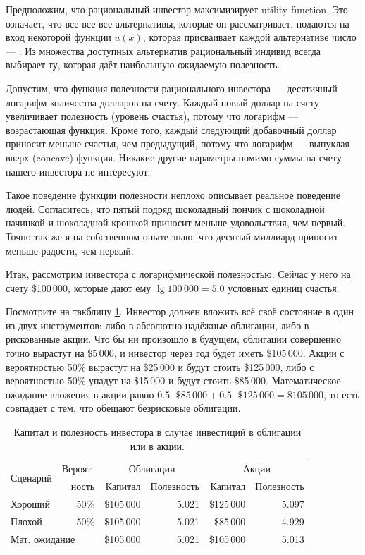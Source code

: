 Предположим, что рациональный инвестор максимизирует 
{utility function}. Это означает, что все-все-все альтернативы, которые он рассматривает, подаются на вход некоторой функции $u(x)$, которая присваивает
каждой альтернативе число --- . Из множества доступных 
альтернатив рациональный индивид всегда выбирает ту, которая даёт наибольшую
ожидаемую полезность.
 
Допустим, что функция полезности рационального инвестора --- десятичный логарифм
количества долларов на счету. Каждый новый доллар на счету увеличивает
полезность (уровень счастья), потому что логарифм --- возрастающая функция.
Кроме того, каждый следующий добавочный доллар приносит меньше счастья, чем
предыдущий, потому что логарифм --- выпуклая вверх (concave) функция. Никакие
другие параметры помимо суммы на счету нашего инвестора не интересуют.
 
Такое поведение функции полезности неплохо описывает реальное поведение людей. Согласитесь, что пятый подряд шоколадный пончик с шоколадной начинкой и шоколадной крошкой приносит меньше удовольствия, чем первый. Точно так же я на собственном опыте знаю, что десятый миллиард приносит меньше радости, чем первый.
 
Итак, рассмотрим инвестора с логарифмической полезностью. Сейчас у него на счету \$100\,000, которые дают ему $\lg 100\,000 = 5.0$ условных единиц счастья.
 
Посмотрите на такблицу \ref{logarithmic_utility_table}. Инвестор должен вложить всё своё состояние в один из двух инструментов: либо в абсолютно надёжные облигации, либо в рискованные акции. Что бы ни произошло в будущем, облигации совершенно точно вырастут на \$5\,000, и инвестор через год будет иметь \$105\,000. Акции с вероятностью 50\% вырастут на \$25\,000 и будут стоить \$125\,000, либо с вероятностью 50\% упадут на \$15\,000 и будут стоить \$85\,000. Математическое ожидание вложения в акции равно $0.5 \cdot \$85\,000 + 0.5 \cdot \$125\,000 = \$105\,000$, то есть совпадает с тем, что обещают безрисковые облигации.

\begin{table}[h!]
\centering
\begin{tabular}{l|r|r|r|r|r}
\multirow{2}{*}{Сценарий} & Вероят- & \multicolumn{2}{c|}{Облигации} & \multicolumn{2}{c}{Акции} \\
\cline{3-6}
        &  ность   & Капитал    & Полезность & Капитал      & Полезность \\ \hline
Хороший & 50\% & \$105\,000 & 5.021 & \$125\,000 & 5.097 \\
Плохой  & 50\% & \$105\,000 & 5.021 & \$85\,000  & 4.929 \\ \hline
\multicolumn{2}{l|}{Мат. ожидание}  & \$105\,000 & 5.021 & \$105\,000 & 5.013
\end{tabular}
    \caption{
        Капитал и полезность инвестора в случае инвестиций в облигации или в
        акции.
    }
    \label{logarithmic_utility_table}
\end{table}

